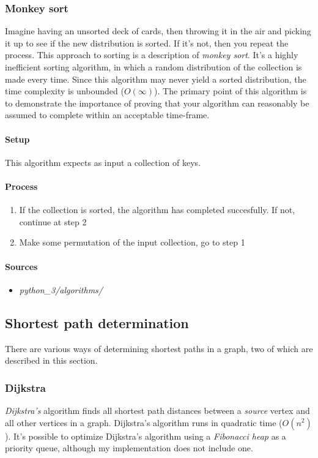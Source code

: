 \documentclass{article}
\begin{document}
\subsubsection{Monkey sort}
Imagine having an unsorted deck of cards, then throwing it in the air and picking it up to see if the new
distribution is sorted. If it's not, then you repeat the process. This approach to sorting is a description of
{\em monkey sort}. It's a highly inefficient sorting algorithm, in which a random distribution of the collection
is made every time. Since this algorithm may never yield a sorted distribution, the time complexity is unbounded
(\(O(\infty)\)). The primary point of this algorithm is to demonstrate the importance of
proving that your algorithm can reasonably be assumed to complete within an acceptable time-frame.

\paragraph{Setup}
This algorithm expects as input a collection of keys.

\paragraph{Process}
\begin{enumerate}
\item{If the collection is sorted, the algorithm has completed succesfully. If not, continue at step 2}
\item{Make some permutation of the input collection, go to step 1}
\end{enumerate}

\begin{samepage}
  \paragraph{Sources}
  \begin{itemize}
  \item{{\em python\_3/algorithms/}}
  \end{itemize}
\end{samepage}


\subsection{Shortest path determination}
There are various ways of determining shortest paths in a graph, two of which are described in this section.

\subsubsection{Dijkstra}
{\em Dijkstra's} algorithm finds all shortest path distances between a {\em source} vertex and all other vertices
in a graph. Dijkstra's algorithm runs in quadratic time (\(O(n^2)\)). It's possible to optimize Dijkstra's algorithm
using a {\em Fibonacci heap} as a priority queue, although my implementation does not include one.
\end{document}
